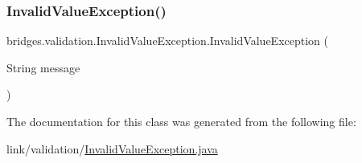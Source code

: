 \subsubsection{\texorpdfstring{Invalid\+Value\+Exception()}{InvalidValueException()}}
{\footnotesize\ttfamily bridges.\+validation.\+Invalid\+Value\+Exception.\+Invalid\+Value\+Exception (\begin{DoxyParamCaption}\item[{String}]{message }\end{DoxyParamCaption})}



The documentation for this class was generated from the following file\+:\begin{DoxyCompactItemize}
\item 
link/validation/\hyperlink{_invalid_value_exception_8java}{Invalid\+Value\+Exception.\+java}\end{DoxyCompactItemize}
